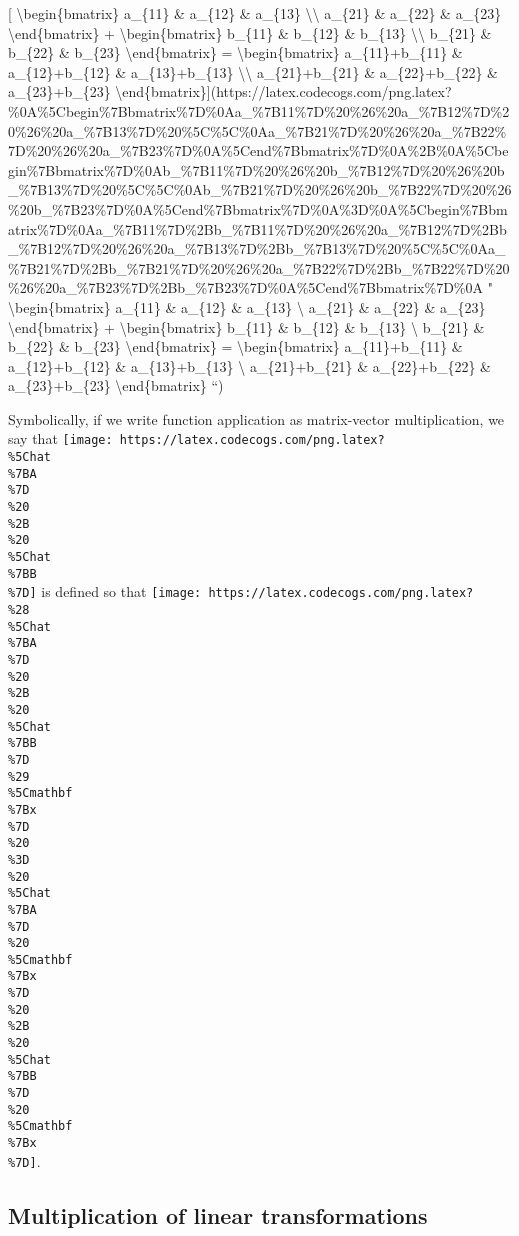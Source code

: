 \documentclass[]{article}
\begin{document}
{[} \textbackslash{}begin\{bmatrix\} a\_\{11\} \& a\_\{12\} \& a\_\{13\}
\textbackslash{}\textbackslash{} a\_\{21\} \& a\_\{22\} \& a\_\{23\}
\textbackslash{}end\{bmatrix\} + \textbackslash{}begin\{bmatrix\} b\_\{11\} \&
b\_\{12\} \& b\_\{13\} \textbackslash{}\textbackslash{} b\_\{21\} \& b\_\{22\}
\& b\_\{23\} \textbackslash{}end\{bmatrix\} = \textbackslash{}begin\{bmatrix\}
a\_\{11\}+b\_\{11\} \& a\_\{12\}+b\_\{12\} \& a\_\{13\}+b\_\{13\}
\textbackslash{}\textbackslash{} a\_\{21\}+b\_\{21\} \& a\_\{22\}+b\_\{22\} \&
a\_\{23\}+b\_\{23\}
\textbackslash{}end\{bmatrix\}{]}(https://latex.codecogs.com/png.latex?\%0A\%5Cbegin\%7Bbmatrix\%7D\%0Aa\_\%7B11\%7D\%20\%26\%20a\_\%7B12\%7D\%20\%26\%20a\_\%7B13\%7D\%20\%5C\%5C\%0Aa\_\%7B21\%7D\%20\%26\%20a\_\%7B22\%7D\%20\%26\%20a\_\%7B23\%7D\%0A\%5Cend\%7Bbmatrix\%7D\%0A\%2B\%0A\%5Cbegin\%7Bbmatrix\%7D\%0Ab\_\%7B11\%7D\%20\%26\%20b\_\%7B12\%7D\%20\%26\%20b\_\%7B13\%7D\%20\%5C\%5C\%0Ab\_\%7B21\%7D\%20\%26\%20b\_\%7B22\%7D\%20\%26\%20b\_\%7B23\%7D\%0A\%5Cend\%7Bbmatrix\%7D\%0A\%3D\%0A\%5Cbegin\%7Bbmatrix\%7D\%0Aa\_\%7B11\%7D\%2Bb\_\%7B11\%7D\%20\%26\%20a\_\%7B12\%7D\%2Bb\_\%7B12\%7D\%20\%26\%20a\_\%7B13\%7D\%2Bb\_\%7B13\%7D\%20\%5C\%5C\%0Aa\_\%7B21\%7D\%2Bb\_\%7B21\%7D\%20\%26\%20a\_\%7B22\%7D\%2Bb\_\%7B22\%7D\%20\%26\%20a\_\%7B23\%7D\%2Bb\_\%7B23\%7D\%0A\%5Cend\%7Bbmatrix\%7D\%0A
" \textbackslash{}begin\{bmatrix\} a\_\{11\} \& a\_\{12\} \& a\_\{13\}
\textbackslash{} a\_\{21\} \& a\_\{22\} \& a\_\{23\}
\textbackslash{}end\{bmatrix\} + \textbackslash{}begin\{bmatrix\} b\_\{11\} \&
b\_\{12\} \& b\_\{13\} \textbackslash{} b\_\{21\} \& b\_\{22\} \& b\_\{23\}
\textbackslash{}end\{bmatrix\} = \textbackslash{}begin\{bmatrix\}
a\_\{11\}+b\_\{11\} \& a\_\{12\}+b\_\{12\} \& a\_\{13\}+b\_\{13\}
\textbackslash{} a\_\{21\}+b\_\{21\} \& a\_\{22\}+b\_\{22\} \&
a\_\{23\}+b\_\{23\} \textbackslash{}end\{bmatrix\} ``)

Symbolically, if we write function application as matrix-vector multiplication,
we say that
\texttt{[image: https://latex.codecogs.com/png.latex?\\\%5Chat\\\%7BA\\\%7D\\\%20\\\%2B\\\%20\\\%5Chat\\\%7BB\\\%7D]}
is defined so that
\texttt{[image: https://latex.codecogs.com/png.latex?\\\%28\\\%5Chat\\\%7BA\\\%7D\\\%20\\\%2B\\\%20\\\%5Chat\\\%7BB\\\%7D\\\%29\\\%5Cmathbf\\\%7Bx\\\%7D\\\%20\\\%3D\\\%20\\\%5Chat\\\%7BA\\\%7D\\\%20\\\%5Cmathbf\\\%7Bx\\\%7D\\\%20\\\%2B\\\%20\\\%5Chat\\\%7BB\\\%7D\\\%20\\\%5Cmathbf\\\%7Bx\\\%7D]}.

\hypertarget{multiplication-of-linear-transformations}{%
\subsection{Multiplication of linear
transformations}\label{multiplication-of-linear-transformations}}
\end{document}
